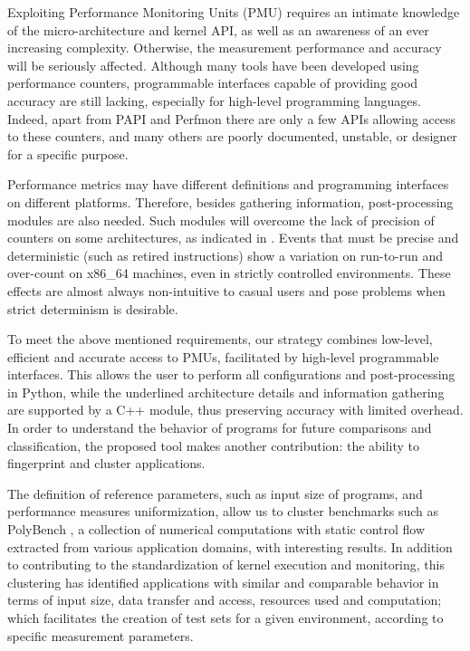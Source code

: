 
Exploiting Performance Monitoring Units (PMU) requires an intimate knowledge of the micro-architecture and kernel API, as well as an awareness of an ever increasing complexity. 
Otherwise, the measurement performance and accuracy will be seriously affected. Although many tools have been developed using performance counters, programmable interfaces capable of providing good accuracy are still lacking, especially for high-level programming languages. Indeed, apart from PAPI \cite{Weaver2013Non-determinismImplementations, Mucci1999PAPI} and Perfmon \cite{Eranian2008Perfmon2} there are only a few APIs allowing access to these counters, and many others are poorly documented, unstable, or designer for a specific purpose.

Performance metrics may have different definitions and programming interfaces on different platforms. 
Therefore, besides gathering information, post-processing modules are also needed. 
Such modules will overcome the lack of precision of counters on some architectures, as indicated in \cite{Weaver2008CanTrusted,Weaver2013Non-determinismImplementations,Das2019SoK:Security}. 
Events that must be precise and deterministic (such as retired instructions) show a variation on run-to-run and over-count on x86\_64 machines, even in strictly controlled environments. These effects are almost always non-intuitive to casual users and pose problems when strict determinism is desirable. 

To meet the above mentioned requirements, our strategy combines low-level, efficient and accurate access to PMUs, facilitated by high-level programmable interfaces. This allows the user to perform all configurations and post-processing in Python,  while the underlined architecture details and information gathering are supported by a C++ module, thus preserving accuracy with limited overhead. 
In order to understand the behavior of programs for future comparisons and classification, the proposed tool makes another contribution: the ability to fingerprint and cluster applications.

The definition of reference parameters, such as input size of programs, and performance measures uniformization, allow us to cluster benchmarks such as PolyBench \cite{Gonzalez2021PolyBench}, a collection of numerical computations with static control flow extracted from various application domains, with interesting results. 
In addition to contributing to the standardization of kernel execution and monitoring, this clustering has identified applications with similar and comparable behavior in terms of input size, data transfer and access, resources used and computation; which facilitates the creation of test sets for a given environment, according to specific measurement parameters. 

